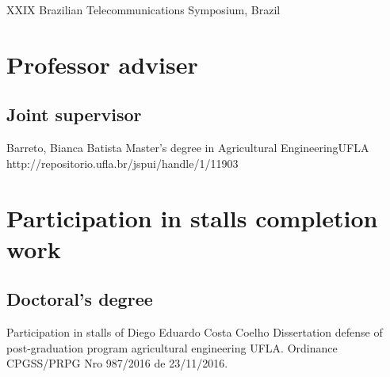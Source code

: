 \documentclass[11pt,a4paper,sans]{moderncv} %
\begin{document}
	      {}{}{}
	      {XXIX Brazilian Telecommunications Symposium, Brazil}





	       
\section{Professor adviser}
\subsection{Joint supervisor}
			{Barreto, Bianca Batista}
			{Master's degree in Agricultural Engineering}{UFLA}
			{http://repositorio.ufla.br/jspui/handle/1/11903}


\section{Participation in stalls completion work}

\subsection{Doctoral's degree}
			{Participation in stalls of Diego Eduardo Costa Coelho}
			{Dissertation defense of post-graduation program agricultural engineering}{}
			{UFLA. Ordinance CPGSS/PRPG Nro 987/2016 de 23/11/2016.}
			
\end{document}
